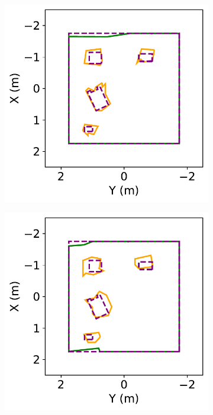 \begin{figure}[!htb]
  \begin{subfigure}[t]{.33\linewidth}
    \centering  \includegraphics[clip,trim=0cm 0cm 0cm 0cm,width=.99\linewidth]{chapter_7_experiments/imgs/man_poly_1.pdf}
    \caption{\label{fig:ch7_man_poly_a}}
  \end{subfigure}
  \begin{subfigure}[t]{.33\linewidth}
    \centering  \includegraphics[clip,trim=0cm 0cm 0cm 0cm,width=.99\linewidth]{chapter_7_experiments/imgs/man_poly_3.pdf}

\end{subfigure}
\end{figure}
